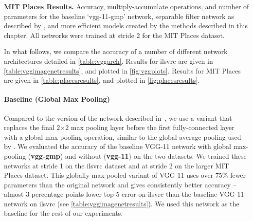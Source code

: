 \documentclass[thesis]{subfiles}
\begin{document}
\begin{table}[tbp]
    \centering
    \caption[Low-rank MIT Places results]{{\bf MIT Places Results.} Accuracy, multiply-accumulate operations, and number of parameters for the baseline `vgg-11-gmp' network, separable filter network as described by \citet{journals/corr/JaderbergVZ14}, and more efficient models created by the methods described in this chapter. All networks were trained at stride 2 for the MIT Places dataset.
    }
    \data
    \pgfplotstabletypeset[
        every head row/.style={
            before row=\toprule,after row=\midrule},
        every last row/.style={
            after row=\bottomrule},
        fixed zerofill,     %
        columns={Network, Stride, Multiply-Acc., Param., Top-1 Acc., Top-5 Acc.},
        column type/.add={lrrrrrr}{},
        columns/Multiply-Acc./.style={
            column name=Multiple-Acc. {\small $\times 10^{8}$},
            preproc/expr={{##1/1e8}}
        },
        columns/Param./.style={
            column name=Param. {\small $\times 10^{7}$},
            preproc/expr={{##1/1e7}}
        },
        columns/Network/.style={string type},
        columns/Stride/.style={precision=0},
        columns/Top-1 Acc./.style={precision=3},
        columns/Top-5 Acc./.style={precision=3},
        highlight col max ={\data}{Top-1 Acc.},
        highlight col max ={\data}{Top-5 Acc.}, 
        highlight col min ={\data}{Param.}, 
        highlight col min ={\data}{Multiply-Acc.}, 
        col sep=comma]{\data}
    \label{table:placesresults}
\end{table}
    
    
    In what follows, we compare the accuracy of a number of different network architectures detailed in  \cref{table:vggarch}. Results for \gls{ilsvrc} are given in \cref{table:vggimagenetresults}, and plotted in \cref{fig:vggplots}. Results for MIT Places are given in \cref{table:placesresults}, and plotted in \cref{fig:placesresults}. 
    
    \paragraph{Baseline (Global Max Pooling)}  Compared to the version of the network described in~\citep{Simonyan2014verydeep}, we use a variant that replaces the final $2$$\times$$2$ max pooling layer before the first fully-connected layer with a global max pooling operation, similar to the global average pooling used by \citet{Lin2013NiN,Szegedy2014going}. We evaluated the accuracy of the baseline VGG-11 network with global max-pooling (\textbf{vgg-gmp}) and without (\textbf{vgg-11}) on the two datasets. We trained these networks at stride 1 on the \gls{ilsvrc} dataset and at stride 2 on the larger MIT Places dataset. This globally max-pooled variant of VGG-11 uses over 75\% fewer parameters than the original network and gives consistently better accuracy -- almost 3 percentage points lower top-5 error on \gls{ilsvrc} than the baseline VGG-11 network on \gls{ilsvrc} (see \cref{table:vggimagenetresults}). We used this network as the baseline for the rest of our experiments.
    
\end{document}
